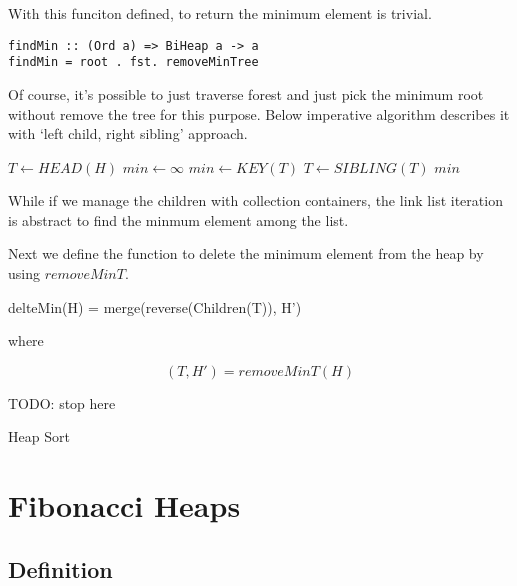 \documentclass{article}
\begin{document}
With this funciton defined, to return the minimum element is trivial.

\begin{lstlisting}
findMin :: (Ord a) => BiHeap a -> a
findMin = root . fst. removeMinTree
\end{lstlisting}

Of course, it's possible to just traverse forest and just pick the
minimum root without remove the tree for this purpose. Below
imperative algorithm describes it with `left child, right sibling' 
approach.

\begin{algorithmic}[1]
  \State $T \gets HEAD(H)$
  \State $min \gets \infty$
      \State $min \gets KEY(T)$
    \EndIf
    \State $T \gets SIBLING(T)$
  \EndWhile
  \State \Return $min$
\EndFunction
\end{algorithmic}

While if we manage the children with collection containers, the link
list iteration is abstract to find the minmum element among the list.

Next we define the function to delete the minimum element from
the heap by using $removeMinT$.

\be
delteMin(H) = merge(reverse(Children(T)), H')
\ee

where

\[
  (T, H') = removeMinT(H)
\]


TODO: stop here

Heap Sort

\section{Fibonacci Heaps}
\label{fib-heap}

\subsection{Definition}

\end{document}
